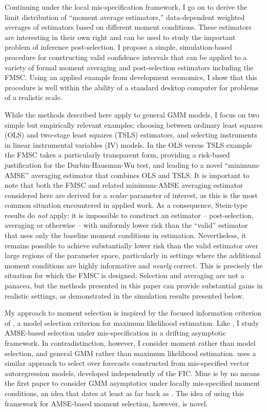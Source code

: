 Continuing under the local mis-specification framework, I go on to derive the limit distribution of ``moment average estimators,'' data-dependent weighted averages of estimators based on different moment conditions.
These estimators are interesting in their own right and can be used to study the important problem of inference post-selection.
I propose a simple, simulation-based procedure for constructing valid confidence intervals that can be applied to a variety of formal moment averaging and post-selection estimators including the FMSC.
Using an applied example from development economics, I show that this procedure is well within the ability of a standard desktop computer for problems of a realistic scale.

While the methods described here apply to general GMM models, I focus on two simple but empirically relevant examples: choosing between ordinary least squares (OLS) and two-stage least squares (TSLS) estimators, and selecting instruments in linear instrumental variables (IV) models. 
In the OLS versus TSLS example the FMSC takes a particularly transparent form, providing a risk-based justification for the Durbin-Hausman-Wu test, and leading to a novel ``minimum-AMSE'' averaging estimator that combines OLS and TSLS.
It is important to note that both the FMSC and related minimum-AMSE averaging estimator considered here are derived for a \emph{scalar} parameter of interest, as this is the most common situation encountered in applied work.
As a consequence, Stein-type results do \emph{not} apply: it is impossible to construct an estimator -- post-selection, averaging or otherwise -- with uniformly lower risk than the ``valid'' estimator that uses only the baseline moment conditions in estimation.
Nevertheless, it remains possible to achieve substantially lower risk than the valid estimator over large regions of the parameter space, particularly in settings where the additional moment conditions are highly informative and \emph{nearly} correct.
This is precisely the situation for which the FMSC is designed.
Selection and averaging are not a panacea, but the methods presented in this paper can provide substantial gains in realistic settings, as demonstrated in the simulation results presented below.

My approach to moment selection is inspired by the focused information criterion of \citet{ClaeskensHjort2003}, a model selection criterion for maximum likelihood estimation. 
Like \citet{ClaeskensHjort2003}, I study AMSE-based selection under mis-specification in a drifting asymptotic framework. 
In contradistinction, however, I consider moment rather than model selection, and general GMM rather than maximum likelihood estimation.
\cite{Schorfheide2005} uses a similar approach to select over forecasts constructed from mis-specified vector autoregression models, developed independently of the FIC. 
Mine is by no means the first paper to consider GMM asymptotics under locally mis-specified moment conditions, an idea that dates at least as far back as \cite{Newey1985}.
The idea of using this framework for AMSE-based moment selection, however, is novel.

